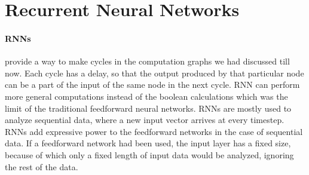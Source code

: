 \documentclass{article}
\begin{document}
















\section{Recurrent Neural Networks}
  \paragraph{RNNs} provide a way to make cycles in the computation graphs we had discussed till now. Each cycle has a delay, so that the output produced by that particular node can be a part of the input of the same node in the next cycle. RNN can perform more general computations instead of the boolean calculations which was the limit of the traditional feedforward neural networks. RNNs  are mostly used to analyze sequential data, where a new input vector arrives at every timestep. RNNs add expressive power to the feedforward networks in the case of sequential data. If a feedforward network had been used, the input layer has a fixed size, because of which only a fixed length of input data would be analyzed, ignoring the rest of the data.
\end{document}
